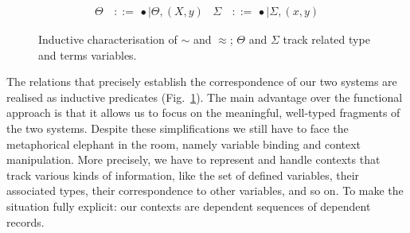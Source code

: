 \documentclass[a4paper,UKenglish]{lipics-v2016}
\newcommand{\ms}{\,}
\newcommand{\mrel}[1]{\mathrel{\ms #1 \ms}}
\newcommand{\bnfdef}{\mrel{::=}}
\newcommand{\of}{\ensuremath{\!:\!}}
\newcommand{\cc}[2]{#1;#2} %
\newcommand{\tyr}{\mathrel{\sim}}
\newcommand{\tmr}{\mathrel{\approx}}
\newcommand{\Prp}{\ensuremath{\textrm{\textasteriskcentered}}}
\newcommand{\nAll}[1]{\ensuremath{\forall #1.\,}}
\newcommand{\Lam}[1]{\ensuremath{\lambda #1.\,}}
\newcommand{\nTyLam}[1]{\ensuremath{\Lambda #1.\,}}
\newcommand{\Prod}[1]{\ensuremath{\Pi #1.\,}}
\newcommand{\emptyctx}{\ensuremath{\bullet}}
\theoremstyle{plain}
\begin{document}
\begin{figure}[t]
  \begin{center}
    \small
    \begin{align*}
      \Theta &\bnfdef \emptyctx \mid \Theta, (X,y) & \Sigma &\bnfdef \emptyctx \mid \Sigma, (x,y)
    \end{align*}
  \end{center}
  \caption{Inductive characterisation of $\tyr$ and $\tmr$; $\Theta$ and $\Sigma$ track related type and terms variables.}
  \label{fig:rel}
\end{figure}

The relations that precisely establish the correspondence of our two systems are realised as inductive predicates (Fig.~\ref{fig:rel}).
The main advantage over the functional approach is that it allows us to focus on the meaningful, well-typed fragments of the two systems.
Despite these simplifications we still have to face the metaphorical elephant in the room, namely variable binding and context manipulation.
More precisely, we have to represent and handle contexts that track various kinds of information, like the set of defined variables, their associated types, their correspondence to other variables, and so on.
To make the situation fully explicit: our contexts are dependent sequences of dependent records.
\end{document}
